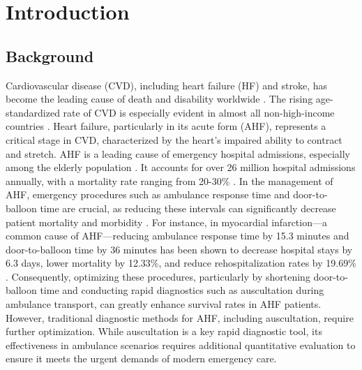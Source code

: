 \section{Introduction}\label{sec:introduction}
\subsection{Background}
Cardiovascular disease (CVD), including heart failure (HF) and stroke, has become the leading cause of death and disability worldwide \cite{virani2020heart,roth2020global,mensah2019global,boorsma2020congestion}. The rising age-standardized rate of CVD is especially evident in almost all non-high-income countries \cite{roth2020global}. Heart failure, particularly in its acute form (AHF), represents a critical stage in CVD, characterized by the heart's impaired ability to contract and stretch. AHF is a leading cause of emergency hospital admissions, especially among the elderly population \cite{sinnenberg2020acute,arrigo2020acute}. It accounts for over 26 million hospital admissions annually, with a mortality rate ranging from 20-30\% \cite{chapman2019clinical}. In the management of AHF, emergency procedures such as ambulance response time and door-to-balloon time are crucial, as reducing these intervals can significantly decrease patient mortality and morbidity \cite{victor2012door,fan2021effects}. For instance, in myocardial infarction—a common cause of AHF—reducing ambulance response time by 15.3 minutes and door-to-balloon time by 36 minutes has been shown to decrease hospital stays by 6.3 days, lower mortality by 12.33\%, and reduce rehospitalization rates by 19.69\% \cite{fan2021effects}. Consequently, optimizing these procedures, particularly by shortening door-to-balloon time and conducting rapid diagnostics such as auscultation during ambulance transport, can greatly enhance survival rates in AHF patients. However, traditional diagnostic methods for AHF, including auscultation, require further optimization.
While auscultation is a key rapid diagnostic tool, its effectiveness in ambulance scenarios requires additional quantitative evaluation to ensure it meets the urgent demands of modern emergency care.

